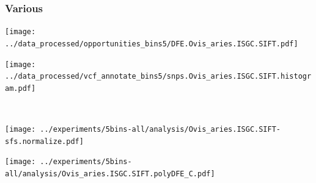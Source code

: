 \subsubsection{Various}

\begin{minipage}{0.49\linewidth}
    \texttt{[image: ../data\_processed/opportunities\_bins5/DFE.Ovis\_aries.ISGC.SIFT.pdf]}
\end{minipage}
\begin{minipage}{0.49\linewidth}
    \texttt{[image: ../data\_processed/vcf\_annotate\_bins5/snps.Ovis\_aries.ISGC.SIFT.histogram.pdf]}
\end{minipage}
\\
\begin{minipage}{0.49\linewidth}
    \texttt{[image: ../experiments/5bins-all/analysis/Ovis\_aries.ISGC.SIFT-sfs.normalize.pdf]}
\end{minipage}
\begin{minipage}{0.4\linewidth}
    \texttt{[image: ../experiments/5bins-all/analysis/Ovis\_aries.ISGC.SIFT.polyDFE\_C.pdf]}
\end{minipage}
